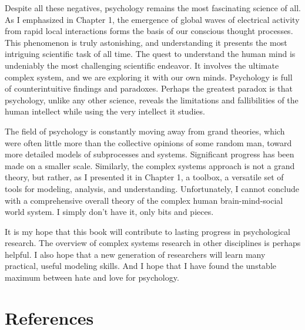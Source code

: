 \documentclass[
  letterpaper,
]{scrbook}
\begin{document}
Despite all these negatives, psychology remains the most fascinating
science of all. As I emphasized in Chapter 1, the emergence of global
waves of electrical activity from rapid local interactions forms the
basis of our conscious thought processes. This phenomenon is truly
astonishing, and understanding it presents the most intriguing
scientific task of all time. The quest to understand the human mind is
undeniably the most challenging scientific endeavor. It involves the
ultimate complex system, and we are exploring it with our own minds.
Psychology is full of counterintuitive findings and paradoxes. Perhaps
the greatest paradox is that psychology, unlike any other science,
reveals the limitations and fallibilities of the human intellect while
using the very intellect it studies.

The field of psychology is constantly moving away from grand theories,
which were often little more than the collective opinions of some random
man, toward more detailed models of subprocesses and systems.
Significant progress has been made on a smaller scale. Similarly, the
complex systems approach is not a grand theory, but rather, as I
presented it in Chapter 1, a toolbox, a versatile set of tools for
modeling, analysis, and understanding. Unfortunately, I cannot conclude
with a comprehensive overall theory of the complex human
brain-mind-social world system. I simply don't have it, only bits and
pieces.

It is my hope that this book will contribute to lasting progress in
psychological research. The overview of complex systems research in
other disciplines is perhaps helpful. I also hope that a new generation
of researchers will learn many practical, useful modeling skills. And I
hope that I have found the unstable maximum between hate and love for
psychology.


\hypertarget{references}{%
\chapter*{References}\label{references}}

\end{document}
